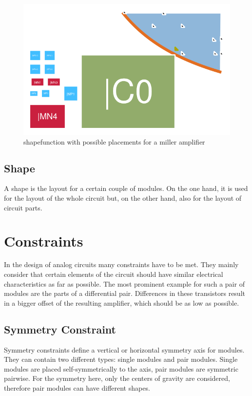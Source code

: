 
\begin{figure}
	\centering
	\includegraphics[scale=1.8]{FIG/shapefunction.png}
	\caption{shapefunction with possible placements for a miller amplifier}
	\label{fig:shapefunction}
\end{figure}

\subsection{Shape}
A shape is the layout for a certain couple of modules. On the one hand, it is used for the layout of the whole circuit but, on the other hand, also for the layout of circuit parts.

\section{Constraints}
In the design of analog circuits many constraints have to be met. They mainly consider that certain elements of the circuit should have similar electrical characteristics as far as possible. The most prominent example for such a pair of modules are the parts of a differential pair. Differences in these transistors result in a bigger offset of the resulting amplifier, which should be as low as possible.

\subsection{Symmetry Constraint}
\label{subsec:symmetry_constraint}
Symmetry constraints define a vertical or horizontal symmetry axis for modules. They can contain two different types: single modules and pair modules. Single modules are placed self-symmetrically to the axis, pair modules are symmetric pairwise. For the symmetry here, only the centers of gravity are considered, therefore pair modules can have different shapes. 

